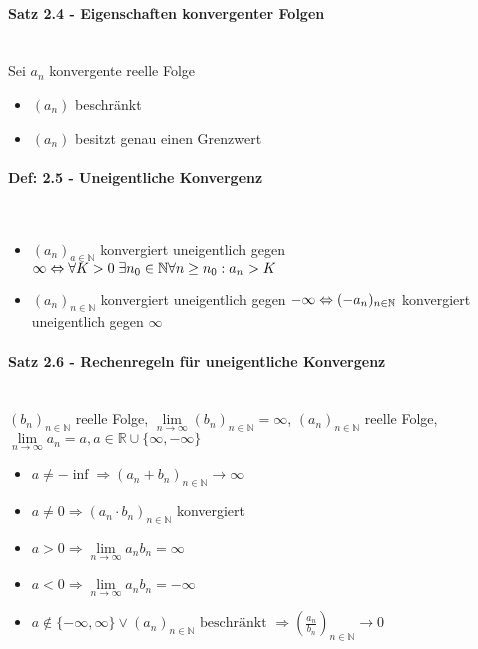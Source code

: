 \documentclass[paper=a3,paper=landscape, fontsize=9pt, DIV=30]{scrartcl}
\newcommand{\real}{{\mathbb{R}}}
\newcommand{\nat}{\mathbb{N}}
\newcommand{\aseq}{(a_n)_{n \in \nat}}
\begin{document}
\begin{multicols*}{4}
  \paragraph{Satz 2.4 - Eigenschaften konvergenter Folgen}\hspace{0pt} \\
  Sei $a_n$ konvergente reelle Folge
  \begin{itemize}
  \item $(a_n)$ beschränkt
  \item $(a_n)$ besitzt genau einen Grenzwert
  \end{itemize}


  \paragraph{Def: 2.5 - Uneigentliche Konvergenz}\hspace{0pt} \\
  \begin{itemize}
  	\item $(a_n)_{a \in \nat}$ konvergiert uneigentlich gegen $\infty \Leftrightarrow\\\forall K > 0 \; \exists n_0 \in \nat \forall n \geq n_0: a_n > K$
  	\item  $\aseq$ konvergiert uneigentlich gegen $-\infty \Leftrightarrow\\ (-a_n)_{n \in \nat}$ konvergiert uneigentlich gegen $\infty$
  \end{itemize}

  \paragraph{Satz 2.6 - Rechenregeln für uneigentliche Konvergenz}\hspace{0pt} \\
  $(b_n)_{n \in \nat}$ reelle Folge, $\lim\limits_{n \rightarrow \infty} (b_n)_{n \in \nat} = \infty$, $\aseq$ reelle Folge, $\lim\limits_{n \rightarrow \infty} a_n = a, a \in \real \cup \{\infty, -\infty\}$

  \begin{itemize}
  \item $a \neq -\inf \Rightarrow (a_n+b_n)_{n \in \nat} \rightarrow \infty$
  \item $a \neq 0 \Rightarrow (a_n \cdot b_n)_{n \in \nat}$ konvergiert
  \item $a > 0 \Rightarrow \lim\limits_{n \rightarrow \infty} a_nb_n = \infty$
  \item $a < 0 \Rightarrow \lim\limits_{n \rightarrow \infty} a_nb_n = -\infty$
  \item $a \notin \{-\infty, \infty\} \vee\aseq \text{ beschränkt } \Rightarrow (\frac{a_n}{b_n})_{n \in \nat} \rightarrow 0$
  \end{itemize}


\end{multicols*}
\end{document}
